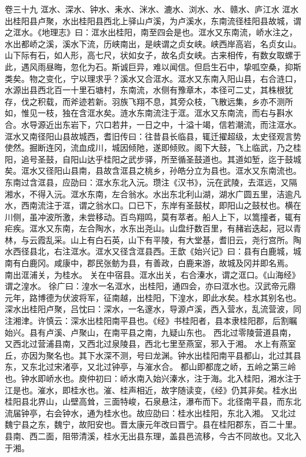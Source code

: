 \documentclass[12pt,UTF8]{ctexbook}
\begin{document}
卷三十九  洭水、深水、钟水、耒水、洣水、漉水、浏水、水、赣水、庐江水 
洭水出桂阳县卢聚，水出桂阳县西北上驿山卢溪，为卢溪水，东南流径桂阳县故城，谓之洭水。《地理志》曰：洭水出桂阳，南至四会是也。洭水又东南流，峤水注之，水出都峤之溪，溪水下流，历峡南出，是峡谓之贞女峡。峡西岸高岩，名贞女山。山下际有石，如人形，高七尺，状如女子，故名贞女峡。古来相传，有数女取螺于此，遇风雨昼晦，忽化为石。斯诚巨异，难以闻信。但启生石中，挚呱空桑，抑斯类矣。物之变化，宁以理求乎？溪水又合洭水。洭水又东南入阳山县，右合涟口，水源出县西北百一十里石塘村，东南流，水侧有豫章木，本径可二丈，其株根犹存，伐之积载，而斧迹若新。羽族飞翔不息，其旁众枝，飞散远集，乡亦不测所如，惟见一枝，独在含洭水矣。涟水东南流注于洭。洭水又东南流，而右与斟水合。水导源近出东岩下，穴口若井，一日之中，十溢十竭，信若潮流，而注洭水。洭水又南径阳山县故城西，耆旧传曰：往昔县长临县，辄迁擢超级，太史径观言势使然。掘断连冈，流血成川，城因倾阤，遂即倾败。阁下大鼓，飞上临武，乃之桂阳，追号圣鼓，自阳山达乎桂阳之武步驿，所至循圣鼓道也。其道如堑，迄于鼓城矣。洭水又径阳山县南，县故含洭县之桃乡，孙皓分立为县也。洭水又东南流也。东南过含洭县，应劭曰：洭水东北入沅。瓒注《汉书》，沅在武陵，去洭远，又隔湘水，不得入沅。洭水东南，左合翁水。水出东北利山湖，湖水广圆五里，洁逾凡水，西南流注于洭，谓之翁水口。口已下，东岸有圣鼓杖，即阳山之鼓杖也。横在川侧，虽冲波所激，未尝移动。百鸟翔鸣，莫有萃者。船人上下，以篙撞者，辄有疟疾。洭水又东南，左合陶水，水东出尧山。山盘纡数百里，有赭岩迭起，冠以青林，与云霞乱采。山上有白石英，山下有平陵，有大堂基，耆旧云，尧行宫所。陶水西径县北，右注洭水。洭水又径含洭县西。王歆《始兴记》曰：县有白鹿城，城南有白鹿冈。咸康中，郡民张鲂为县，有善政，白鹿来游，故城及冈并即名焉。
南出洭浦关，为桂水。
关在中宿县。洭水出关，右合溱水，谓之洭口。《山海经》谓之湟水。
徐广曰：湟水一名洭水，出桂阳，通四会，亦曰洭水也。汉武帝元鼎元年，路博德为伏波将军，征南越，出桂阳，下湟水，即此水矣。桂水其别名也。深水出桂阳卢聚，吕忱曰：深水，一名邃水，导源卢溪，西入营水，乱流营波，同注湘津。许慎云：深水出桂阳南平县也。《经》书桂阳者，县本隶桂阳郡，后割瞩始兴。县有卢溪、卢聚山，在南平县之南，九疑山东也。
西北过零陵营道县南，又西北过营浦县南，又西北过泉陵县，西北七里至燕室，邪入于湘。
水上有燕室丘，亦因为聚名也。其下水深不测，号曰龙渊。钟水出桂阳南平县都山，北过其县东，又东北过宋渚亭，又北过钟亭，与漼水合。
都山即都庞之峤，五岭之第三岭也。钟水即峤水也。庾仲初曰：峤水南入始兴溱水，注于海。北入桂阳，湘水注于江是也。漼水，即桂水也。漼、桂声相近，故字随读变，《经》仍其非矣。桂水出桂阳县北界山，山壁高耸，三面特峻，石泉悬注，瀑布而下。北径南平县，而东北流届钟亭，右会钟水，通为桂水也。故应劭曰：桂水出桂阳，东北入湘。
又北过魏宁县之东，魏宁，故阳安也。晋太康元年改曰晋宁。县在桂阳郡东，百二十里。县南、西二面，阻带清溪，桂水无出县东理，盖县邑流移，今古不同故也。又北入于湘。
\end{document}
